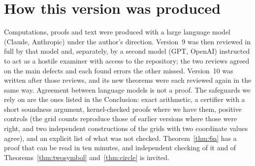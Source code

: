 \section{How this version was produced}\label{app:produced}

Computations, proofs and text were produced with a large language model (Claude, Anthropic)
under the author's direction.  Version~9 was then reviewed in full by that model and, separately,
by a second model (GPT, OpenAI) instructed to act as a hostile examiner with access to the
repository; the two reviews agreed on the main defects and each found errors the other missed.
Version~10 was written after those reviews, and its new theorems were each reviewed again in the
same way.  Agreement between language models is not a
proof.  The safeguards we rely on are the ones listed in the Conclusion: exact arithmetic, a
certifier with a short soundness argument, kernel-checked proofs where we have them, positive
controls (the grid counts reproduce those of earlier versions where
those were right, and two independent constructions of the grids with two coordinate values agree), and an explicit list of what was not checked.  Theorem~\ref{thm:6n} has a
proof that can be read in ten minutes, and independent checking of it and of
Theorems~\ref{thm:twosymbol} and~\ref{thm:circle} is invited.
